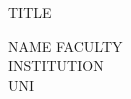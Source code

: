 \documentclass[de,phd]{swathesis}
\begin{document}

{\noindent\centering {}\LARGE TITLE\par}\vspace{\baselineskip}
{\noindent\large \raggedleft NAME \hfill FACULTY\\
  INSTITUTION\\
  UNI\par}\vspace{\baselineskip}

\noindent

\end{document}
